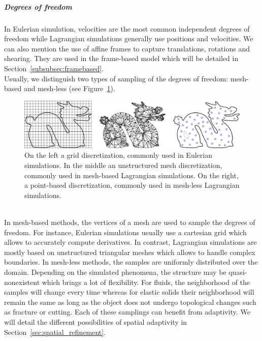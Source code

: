 \subparagraph{Degrees of freedom}
In Eulerian simulation, velocities are the most common independent degrees of freedom while Lagrangian simulations generally use positions and velocities. 
We can also mention the use of affine frames to capture translations, rotations and shearing. They are used in the frame-based model which will be detailed in Section~\ref{subsubsec:framebased}.
\\ 
Usually, we distinguish two types of sampling of the degrees of freedom: mesh-based and mesh-less (see Figure~\ref{fig:discretization}).
\begin{figure}[!h]
	\centering
	\includegraphics[width=\linewidth]{images/continuum_mechanics/discretization.png}
	\caption[STAR mechanics: Discretization]{\label{fig:discretization} On the left a grid discretization, commonly used in Eulerian simulations. In the middle an unstructured mesh discretization, commonly used in mesh-based Lagrangian simulations. On the right, a point-based discretization, commonly used in mesh-less Lagrangian simulations.}
\end{figure}
\\
In mesh-based methods, the vertices of a mesh are used to sample the degrees of freedom. For instance, Eulerian simulations usually use a cartesian grid which allows to accurately compute derivatives. 
In contrast, Lagrangian simulations are mostly based on unstructured triangular meshes which allows to handle complex boundaries.
In mesh-less methods, the samples are uniformly distributed over the domain. Depending on the simulated phenomena, the structure may be quasi-nonexistent which brings a lot of flexibility. For fluids, the neighborhood of the samples will change every time whereas for elastic solids their neighborhood will remain the same as long as the object does not undergo topological changes such as fracture or cutting.
Each of these samplings can benefit from adaptivity. We will detail the different possibilities of spatial adaptivity in Section~\ref{sec:spatial_refinement}.

